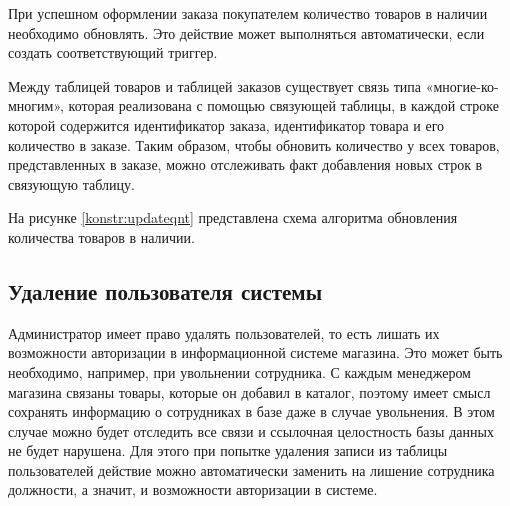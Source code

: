 При успешном оформлении заказа покупателем количество товаров в наличии необходимо обновлять. Это действие может выполняться автоматически, если создать соответствующий триггер.

Между таблицей товаров и таблицей заказов существует связь типа «многие-ко-многим», которая реализована с помощью связующей таблицы, в каждой строке которой содержится идентификатор заказа, идентификатор товара и его количество в заказе. Таким образом, чтобы обновить количество у всех товаров, представленных в заказе, можно отслеживать факт добавления новых строк в связующую таблицу.

На рисунке \ref{konstr:updateqnt} представлена схема алгоритма обновления количества товаров в наличии.

\begin{figure}[H]
\end{figure}

\subsection{Удаление пользователя системы}

Администратор имеет право удалять пользователей, то есть лишать их возможности авторизации в информационной системе магазина. Это может быть необходимо, например, при увольнении сотрудника. С каждым менеджером магазина связаны товары, которые он добавил в каталог, поэтому имеет смысл сохранять информацию о сотрудниках в базе даже в случае увольнения. В этом случае можно будет отследить все связи и ссылочная целостность базы данных не будет нарушена. Для этого при попытке удаления записи из таблицы пользователей действие можно автоматически заменить на лишение сотрудника должности, а значит, и возможности авторизации в системе.

